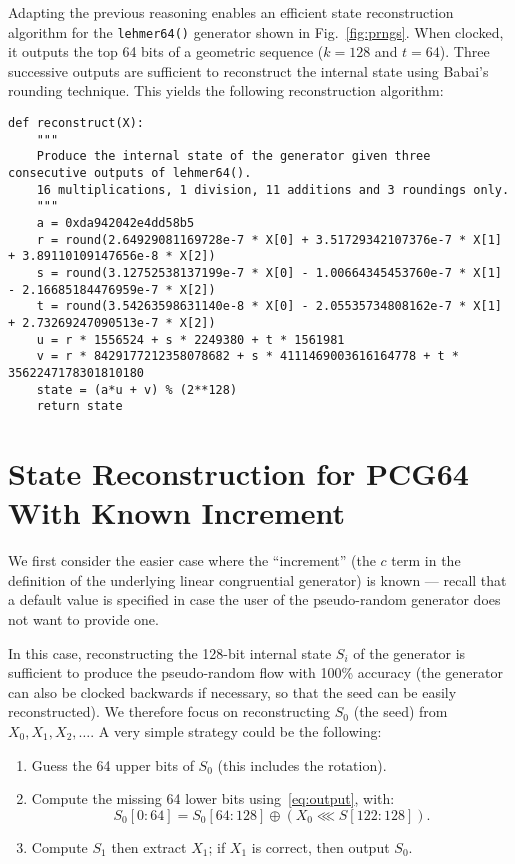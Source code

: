 \documentclass[submission,svgnames,journal=tosc]{iacrtrans}
\begin{document}
Adapting the previous reasoning enables an efficient state reconstruction
algorithm for the \texttt{lehmer64()} generator shown in
Fig.~\ref{fig:prngs}. When clocked, it outputs the top 64 bits of a geometric
sequence ($k=128$ and $t=64$). Three successive outputs are sufficient to
reconstruct the internal state using Babai's rounding technique. This yields the
following reconstruction algorithm:
\begin{verbatim}
def reconstruct(X):
    """
    Produce the internal state of the generator given three consecutive outputs of lehmer64().
    16 multiplications, 1 division, 11 additions and 3 roundings only.
    """
    a = 0xda942042e4dd58b5
    r = round(2.64929081169728e-7 * X[0] + 3.51729342107376e-7 * X[1] + 3.89110109147656e-8 * X[2])
    s = round(3.12752538137199e-7 * X[0] - 1.00664345453760e-7 * X[1] - 2.16685184476959e-7 * X[2])
    t = round(3.54263598631140e-8 * X[0] - 2.05535734808162e-7 * X[1] + 2.73269247090513e-7 * X[2])
    u = r * 1556524 + s * 2249380 + t * 1561981
    v = r * 8429177212358078682 + s * 4111469003616164778 + t * 3562247178301810180
    state = (a*u + v) % (2**128)
    return state
\end{verbatim}


\section{State Reconstruction for \textsf{PCG64} With Known Increment}
\label{sec:Cknown}

We first consider the easier case where the ``increment'' (the $c$ term in the
definition of the underlying linear congruential generator) is known --- recall
that a default value is specified in case the user of the pseudo-random
generator does not want to provide one.

In this case, reconstructing the 128-bit internal state $S_i$ of the generator
is sufficient to produce the pseudo-random flow with 100\% accuracy (the
generator can also be clocked backwards if necessary, so that the seed can be
easily reconstructed). We therefore focus on reconstructing $S_0$ (the seed)
from $X_0, X_1, X_2, \dots$. A very simple strategy could be the following:
\begin{enumerate}
\item Guess the 64 upper bits of $S_0$ (this includes the rotation).
\item Compute the missing 64 lower bits using~\eqref{eq:output}, with:
\[
   S_0[0:64] = S_0[64:128] \oplus (X_0  \lll S[122:128]).
\]
\item Compute $S_1$ then extract $X_1$; if $X_1$ is correct, then output $S_0$.
\end{enumerate}
\end{document}
